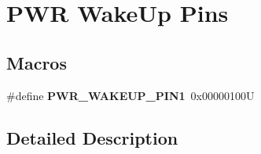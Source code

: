 \hypertarget{group___p_w_r___wake_up___pins}{}\section{P\+WR Wake\+Up Pins}
\label{group___p_w_r___wake_up___pins}
\subsection*{Macros}
\begin{DoxyCompactItemize}
\item 
\mbox{\label{group___p_w_r___wake_up___pins_ga0da8e7cbe0826e93b777ae4419a1cd05}} 
\#define {\bfseries P\+W\+R\+\_\+\+W\+A\+K\+E\+U\+P\+\_\+\+P\+I\+N1}~0x00000100U
\end{DoxyCompactItemize}


\subsection{Detailed Description}
